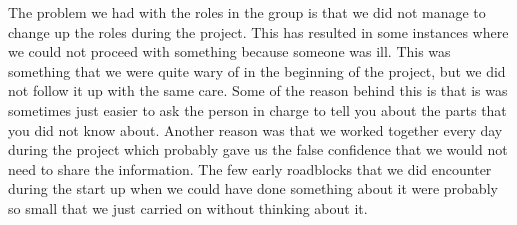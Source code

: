 
    
    
    
    

    The problem we had with the roles in the group is that we did not manage to change up the roles during the project. This has resulted in some instances where we could not proceed with something because someone was ill. This was something that we were quite wary of in the beginning of the project, but we did not follow it up with the same care. Some of the reason behind this is that is was sometimes just easier to ask the person in charge to tell you about the parts that you did not know about. Another reason was that we worked together every day during the project which probably gave us the false confidence that we would not need to share the information. The few early roadblocks that we did encounter during the start up when we could have done something about it were probably so small that we just carried on without thinking about it. 
